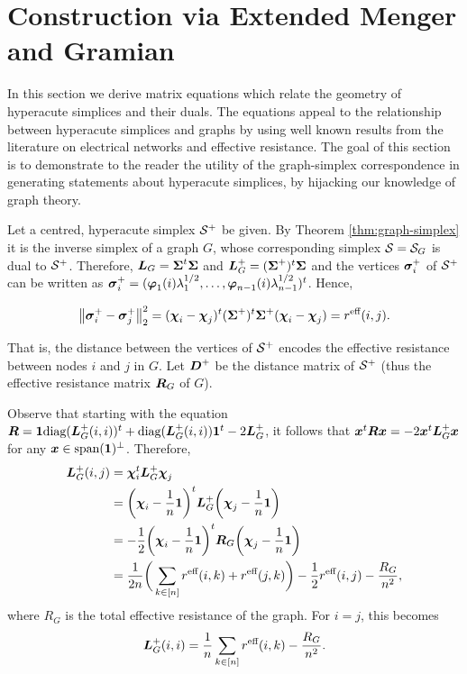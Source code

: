 \section{Construction via Extended Menger and Gramian}
In this section we derive matrix equations which relate the geometry of hyperacute simplices and their duals. The equations appeal to the relationship between hyperacute simplices and graphs by using well known results from the literature on electrical networks and effective resistance. The goal of this section is to demonstrate to the reader the utility of the graph-simplex correspondence in generating statements about hyperacute simplices, by hijacking our knowledge of graph theory. 

Let a centred, hyperacute simplex $\mathcal{S}^+$ be given. By Theorem \ref{thm:graph-simplex} it is the inverse simplex of a graph $G$, whose corresponding simplex $\mathcal{S} = \mathcal{S}_G$ is dual to $\mathcal{S}^+$.
Therefore, $\vb*{L}_G=\boldsymbol{\Sigma}^t\boldsymbol{\Sigma}$ and $\vb*{L}_G^+=(\boldsymbol{\Sigma}^+)^t\boldsymbol{\Sigma}$ and the vertices $\vb*{\sigma}_i^+$ of $\mathcal{S}^+$ can be written as $\vb*{\sigma}_i^+=(\vb*{\varphi}_1(i)\lambda_1^{1/2},\dots,\vb*{\varphi}_{n-1}(i)\lambda_{n-1}^{1/2})^t$. Hence, 

\begin{align*}
\norm{\vb*{\sigma}_i^+-\vb*{\sigma}_j^+}_2^2 = (\boldsymbol{\chi}_i-\boldsymbol{\chi}_j)^t (\boldsymbol{\Sigma}^+)^t\boldsymbol{\Sigma}^+ (\boldsymbol{\chi}_i-\boldsymbol{\chi}_j) = r^{\text{eff}}(i,j).
\end{align*}

That is, the distance between the vertices of $\mathcal{S}^+$ encodes the effective resistance between nodes $i$ and $j$ in $G$. Let $\vb*{D}^+$ be the distance matrix of $\mathcal{S}^+$ (thus the effective resistance matrix $\vb*{R}_G$ of $G$). 


 Observe that starting with the equation $\vb*{R}=\vb{1}\text{diag}(\vb*{L}_G^+(i,i))^t + \text{diag}(\vb*{L}_G^+(i,i))\vb{1}^t - 2\vb*{L}_G^+$,  it follows that $\vb*{x}^t \vb*{R}\vb*{x} = -2\vb*{x}^t \vb*{L}_G^+\vb*{x}$ for any $\vb*{x}\in\textnormal{span}(\vb{1})^\perp$. Therefore, 
\begin{align*}
\vb*{L}_G^+(i,j)&=\boldsymbol{\chi}_i^t \vb*{L}_G^+\boldsymbol{\chi}_j \\
&= \bigg(\boldsymbol{\chi}_i-\frac{1}{n}\vb{1}\bigg)^t \vb*{L}_G^+\bigg(\boldsymbol{\chi}_j-\frac{1}{n}\vb{1}\bigg) \\
&= -\frac{1}{2}\bigg(\boldsymbol{\chi}_i-\frac{1}{n}\vb{1}\bigg)^t \vb*{R}_G\bigg(\boldsymbol{\chi}_j-\frac{1}{n}\vb{1}\bigg) \\
&= \frac{1}{2n}\bigg(\sum_{k\in[n]}r^{\text{eff}}(i,k)+r^{\text{eff}}(j,k)\bigg) - \frac{1}{2}r^{\text{eff}}(i,j) -\frac{R_G}{n^2},
\end{align*}
where $R_G$ is the total effective resistance of the graph. 
For $i=j$, this becomes 
\begin{align*}
\vb*{L}_G^+(i,i) = \frac{1}{n} \sum_{k\in[n]}r^{\text{eff}}(i,k) - \frac{R_G}{n^2}.
\end{align*}

